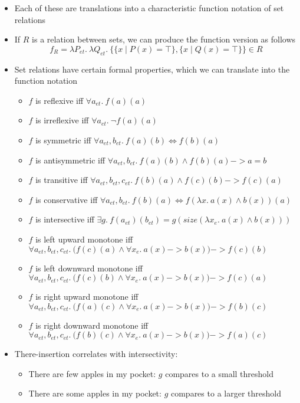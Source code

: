 \documentclass[a4paper]{article}
\begin{document}
\begin{itemize}
\item Each of these are translations into a characteristic function notation of set relations
\item If $R$ is a relation between sets, we can produce the function version as follows
  $$f_R = \lambda P_{et}.\ \lambda Q_{et}.\ \{\{x\mid P(x) = \top\},\{x\mid Q(x) = \top\}\}\in R$$
\item Set relations have certain formal properties, which we can translate into the function notation
  \begin{itemize}
  \item $f$ is reflexive iff $\forall a_{et}.\ f(a)(a)$
  \item $f$ is irreflexive iff $\forall a_{et}.\ \lnot f(a)(a)$
  \item $f$ is symmetric iff $\forall a_{et}, b_{et}.\ f(a)(b) \iff f(b)(a)$
  \item $f$ is antisymmetric iff $\forall a_{et}, b_{et}.\ f(a)(b) \land f(b)(a) -> a = b$
  \item $f$ is transitive iff $\forall a_{et}, b_{et}, c_{et}.\ f(b)(a) \land f(c)(b) -> f(c)(a)$
  \item $f$ is conservative iff $\forall a_{et}, b_{et}.\ f(b)(a) \iff f(\lambda x.\ a(x) \land b(x))(a)$
  \item $f$ is intersective iff $\exists g.\ f(a_{et})(b_{et}) = g(size(\lambda x_e.\ a(x) \land b(x)))$
  \item $f$ is left upward monotone iff $\forall a_{et}, b_{et}, c_{et}.\ \Big(f(c)(a) \land \forall x_e.\ a(x)
    -> b(x)\Big) -> f(c)(b)$
  \item $f$ is left downward monotone iff $\forall a_{et}, b_{et}, c_{et}.\ \Big(f(c)(b) \land \forall x_e.\ a(x)
    -> b(x)\Big) -> f(c)(a)$
  \item $f$ is right upward monotone iff $\forall a_{et}, b_{et}, c_{et}.\ \Big(f(a)(c) \land \forall x_e.\ a(x)
    -> b(x)\Big) -> f(b)(c)$
  \item $f$ is right downward monotone iff $\forall a_{et}, b_{et}, c_{et}.\ \Big(f(b)(c) \land \forall x_e.\ a(x)
    -> b(x)\Big) -> f(a)(c)$
  \end{itemize}
\item There-insertion correlates with intersectivity:
  \begin{itemize}
  \item There are few apples in my pocket: $g$ compares to a small threshold
  \item There are some apples in my pocket: $g$ compares to a larger threshold

\end{itemize}
\end{itemize}
\end{document}
